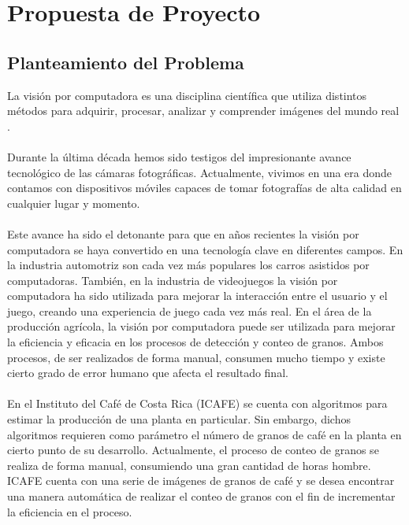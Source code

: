 \section{\textbf{Propuesta de Proyecto}}\label{propuesta} 
\subsection{Planteamiento del Problema}
La visi\'on por computadora es una disciplina cient\'ifica que utiliza distintos m\'etodos para adquirir, procesar, analizar y comprender im\'agenes del mundo real \cite{klette}. 
\\\\
Durante la \'ultima d\'ecada hemos sido testigos del impresionante avance tecnol\'ogico de las c\'amaras fotogr\'aficas. Actualmente, vivimos en una era donde contamos con dispositivos m\'oviles capaces de tomar fotograf\'ias de alta calidad en cualquier lugar y momento. 
\\\\
Este avance ha sido el detonante para que en a\~nos recientes la visi\'on por computadora se haya convertido en una tecnolog\'ia clave en diferentes campos. En la industria automotriz son cada vez m\'as populares los carros asistidos por computadoras. Tambi\'en, en la industria de videojuegos la visi\'on por computadora ha sido utilizada para mejorar la interacci\'on entre el usuario y el juego, creando una experiencia de juego cada vez m\'as real. En el \'area de la producci\'on agr\'icola, la visi\'on por computadora puede ser utilizada para mejorar la eficiencia y eficacia en los procesos de detecci\'on y conteo de granos. Ambos procesos, de ser realizados de forma manual, consumen mucho tiempo y existe cierto grado de error humano que afecta el resultado final.
\\\\
En el Instituto del Caf\'e de Costa Rica (ICAFE) se cuenta con algoritmos para estimar la producci\'on de una planta en particular. Sin embargo, dichos algoritmos requieren como par\'ametro el n\'umero de granos de caf\'e en la planta en cierto punto de su desarrollo. Actualmente, el proceso de conteo de granos se realiza de forma manual, consumiendo una gran cantidad de horas hombre. ICAFE cuenta con una serie de im\'agenes de granos de caf\'e y se desea encontrar una manera autom\'atica de realizar el conteo de granos con el fin de incrementar la eficiencia en el proceso.
\\\\\\
